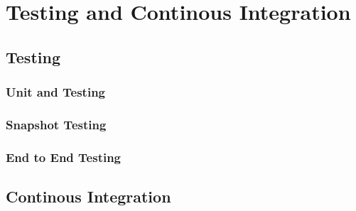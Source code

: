 \chapter{Testing and Continous Integration}
\label{chapter:testingAndCI}

\section{Testing}
\label{section:testing}


\subsection{Unit and Testing}
\label{subsection:unitTesting}

\subsection{Snapshot Testing}
\label{subsection:snapshotTesting}

\subsection{End to End Testing}
\label{subsection:e2e}


\section{Continous Integration}
\label{section:CI}

